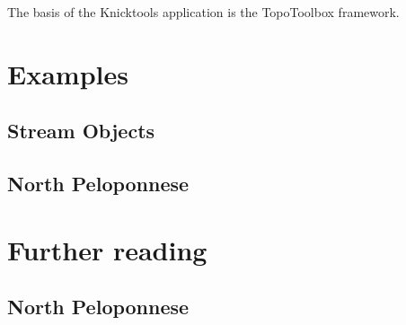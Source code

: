 \documentclass[11pt]{report}
\begin{document}
The basis of the Knicktools application is the TopoToolbox framework.

\chapter{Examples}

\section{Stream Objects}



\section{North Peloponnese}

\chapter{Further reading}

\section{}

\section{North Peloponnese}


\begin{footnotesize}
\singlespacing


\end{footnotesize}
\end{document}
